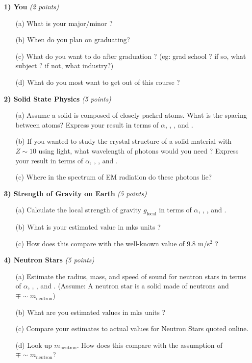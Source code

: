 {\large
\textbf{1) You} \hfill \textit{(2 points)}
\begin{itemize}
\item[(a)]What is your major/minor ? 
\item[(b)]When do you plan on graduating?
\item[(c)]What do you want to do after graduation ? (eg: grad school ? if so, what subject ? if not, what industry?)
\item[(d)]What do you most want to get out of this course ? 
\end{itemize}

\vspace*{0.25in}

\textbf{2) Solid State Physics} \hfill \textit{(5 points)}
\begin{itemize}
\item[(a)] Assume a solid is composed of closely packed atoms. What is the spacing between atoms?  Express your result in terms of  $\alpha$, \aG, \mp, and \me.
\item[(b)] If you wanted to study the crystal structure of a solid material with $Z\sim10$ using light, what wavelength of photons would you need ?
Express your result in terms of  $\alpha$, \aG, \mp, and \me.
\item[(c)] Where in the spectrum of EM radiation do these photons lie?
\end{itemize}

\vspace*{0.25in}

\textbf{3) Strength of Gravity on Earth} \hfill \textit{(5 points)}
\begin{itemize}
\item[(a)]Calculate the local strength of gravity $g_{\textrm{local}}$ in terms of $\alpha$, \aG, \mp, and \me.
\item[(b)]What is your estimated value in mks units ?
\item[(c)]How does this compare with the well-known value of 9.8 m/s$^2$ ?
\end{itemize}

\vspace*{0.25in}

\textbf{4) Neutron Stars } \hfill \textit{(5 points)}
\begin{itemize}
\item[(a)]Estimate the radius, mass, and speed of sound for neutron stars in terms of $\alpha$, \aG, \mp, and \me.
(Assume: A neutron star is a solid made of neutrons and $\mp \sim m_{\textrm{neutron}}$)
\item[(b)]What are you estimated values in mks units ?
\item[(c)]Compare your estimates to actual values for Neutron Stars quoted online.
\item[(d)]Look up $m_{\textrm{neutron}}$. How does this compare with the assumption of $\mp \sim m_{\textrm{neutron}}$?
\end{itemize}

}
